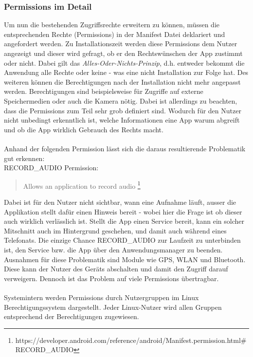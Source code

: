 	\subsubsection{Permissions im Detail}
	Um nun die bestehenden Zugriffsrechte erweitern zu können, müssen die entsprechenden Rechte (Permissions) in der Manifest Datei deklariert und angefordert werden. Zu Installationszeit werden diese Permissions dem Nutzer angezeigt und dieser wird gefragt, ob er den Rechtswünschen der App zustimmt oder nicht. Dabei gilt das \textit{Alles-Oder-Nichts-Prinzip}, d.h. entweder bekommt die Anwendung alle Rechte oder keine - was eine nicht Installation zur Folge hat. Des weiteren können die Berechtigungen nach der Installation nicht mehr angepasst werden.	Berechtigungen sind beispielsweise für Zugriffe auf externe Speichermedien oder auch die Kamera nötig. Dabei ist allerdings zu beachten, dass die Permissions zum Teil sehr grob definiert sind. Wodurch für den Nutzer nicht unbedingt erkenntlich ist, welche Informationen eine App warum abgreift und ob die App wirklich Gebrauch des Rechts macht.\\\\
	Anhand der folgenden Permission lässt sich die daraus resultierende Problematik gut erkennen:\\
	RECORD\_AUDIO Permission:
	\begin{quote}
	Allows an application to record audio \footnote{https://developer.android.com/reference/android/Manifest.permission.html\#RECORD\_AUDIO}
	\end{quote} 
	Dabei ist für den Nutzer nicht sichtbar, wann eine Aufnahme läuft, ausser die Applikation stellt dafür einen Hinweis bereit - wobei hier die Frage ist ob dieser auch wirklich verlässlich ist. Stellt die App einen Service bereit, kann ein solcher Mitschnitt auch im Hintergrund geschehen, und damit auch während eines Telefonats. Die einzige Chance RECORD\_AUDIO zur Laufzeit zu unterbinden ist, den Service bzw. die App über den Anwendungsmanager zu beenden.	Ausnahmen für diese Problematik sind Module wie GPS, WLAN und Bluetooth. Diese kann der Nutzer des Geräts abschalten und damit den Zugriff darauf verweigern.
	Dennoch ist das Problem auf viele Permissions übertragbar.\\\\
	Systemintern werden Permissions durch Nutzergruppen im Linux Berechtigungssystem dargestellt\cite[S. 28]{Drake2014}. Jeder Linux-Nutzer wird allen Gruppen entsprechend der Berechtigungen zugewiesen.
